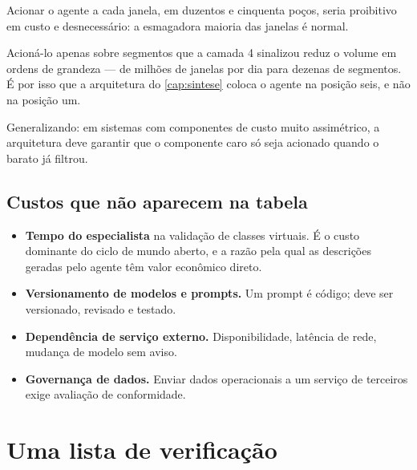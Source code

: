\begin{destaque}
Acionar o agente a cada janela, em duzentos e cinquenta poços, seria proibitivo em custo
e desnecessário: a esmagadora maioria das janelas é normal.

Acioná-lo apenas sobre segmentos que a camada 4 sinalizou reduz o volume em ordens de
grandeza --- de milhões de janelas por dia para dezenas de segmentos. É por isso que a
arquitetura do \cref{cap:sintese} coloca o agente na posição seis, e não na posição um.

Generalizando: em sistemas com componentes de custo muito assimétrico, a arquitetura
deve garantir que o componente caro só seja acionado quando o barato já filtrou.
\end{destaque}

\subsection{Custos que não aparecem na tabela}

\begin{itemize}[leftmargin=*,itemsep=0.3em]
  \item \textbf{Tempo do especialista} na validação de classes virtuais. É o custo
        dominante do ciclo de mundo aberto, e a razão pela qual as descrições geradas
        pelo agente têm valor econômico direto.
  \item \textbf{Versionamento de modelos e prompts.} Um prompt é código; deve ser
        versionado, revisado e testado.
  \item \textbf{Dependência de serviço externo.} Disponibilidade, latência de rede,
        mudança de modelo sem aviso.
  \item \textbf{Governança de dados.} Enviar dados operacionais a um serviço de terceiros
        exige avaliação de conformidade.
\end{itemize}

\section{Uma lista de verificação}

